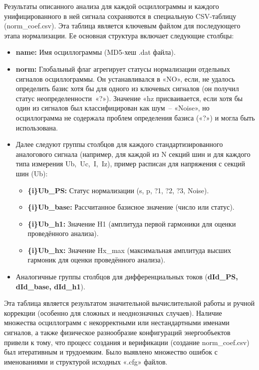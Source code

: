 Результаты описанного анализа для каждой осциллограммы и каждого унифицированного в ней
сигнала сохраняются в специальную CSV-таблицу (norm\_coef.csv). Эта таблица является
ключевым файлом для последующего этапа нормализации. Ее основная структура включает
следующие столбцы:

\begin{itemize}
\item \textbf{name:} Имя осциллограммы (MD5-хеш .dat файла).
\item \textbf{norm:} Глобальный флаг агрегирует статусы нормализации отдельных сигналов осциллограммы. Он устанавливался в «NO», если, не удалось определить базис хотя бы для одного из ключевых сигналов (он получил статус неопределенности~«?»). Значение «hz присваивается, если хотя бы один из сигналов был классифицирован как шум~-- «Noise», но осциллограмма не содержала проблем определения базиса («?») и могла быть использована.
\item Далее следуют группы столбцов для каждого стандартизированного аналогового сигнала (например, для каждой из N секций шин и для каждого типа измерения Ub,~Uc,~I,~Iz), пример расписан для напряжения с секций шин (Ub):
  \begin{itemize}
  \item \textbf{\{i\}Ub\_PS:} Статус нормализации (s, p, ?1, ?2, ?3, Noise).
  \item \textbf{\{i\}Ub\_base:} Рассчитанное базисное значение (число или статус).
  \item \textbf{\{i\}Ub\_h1:} Значение H1 (амплитуда первой гармоники для оценки проведённого анализа).
  \item \textbf{\{i\}Ub\_hx:} Значение Hx\_max (максимальная амплитуда высших гармоник для оценки проведённого анализа).
  \end{itemize}
\item Аналогичные группы столбцов для дифференциальных токов (\textbf{dId\_\allowbreak PS, dId\_\allowbreak base, dId\_\allowbreak h1}).
\end{itemize}

Эта таблица является результатом значительной вычислительной работы и ручной коррекции
(особенно для сложных и неоднозначных случаев). Наличие множества осциллограмм с
некорректными или нестандартными именами сигналов, а также физическое разнообразие
конфигураций энергообъектов привели к тому, что процесс создания и верификации (создание
norm\_coef.csv) был итеративным и трудоемким. Было выявлено множество ошибок с
именованиями и структурой исходных «.cfg» файлов.

